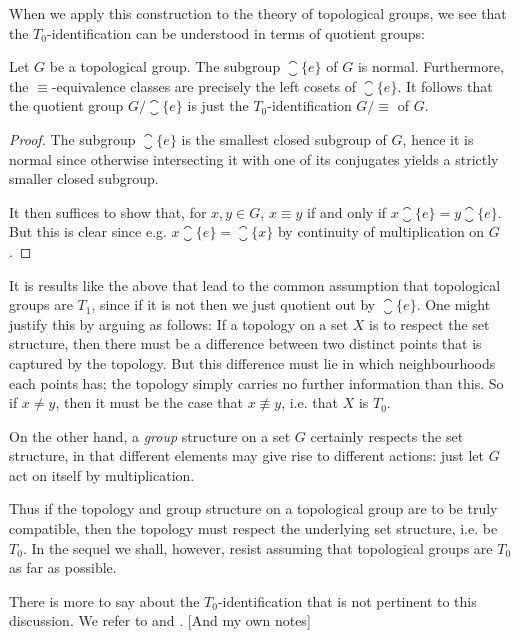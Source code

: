 \documentclass[article, a4paper, 11pt, oneside]{memoir}
\numberwithin{equation}{chapter}
\begin{document}
When we apply this construction to the theory of topological groups, we see that the $T_0$-identification can be understood in terms of quotient groups:

\begin{proposition}
    Let $G$ be a topological group. The subgroup $\closure{\{e\}}$ of $G$ is normal. Furthermore, the $\equiv$-equivalence classes are precisely the left cosets of $\closure{\{e\}}$. It follows that the quotient group $G / \closure{\{e\}}$ is just the $T_0$-identification $G/{\equiv}$ of $G$.
\end{proposition}

\begin{proof}
    The subgroup $\closure{\{e\}}$ is the smallest closed subgroup of $G$, hence it is normal since otherwise intersecting it with one of its conjugates yields a strictly smaller closed subgroup.

    It then suffices to show that, for $x,y \in G$, $x \equiv y$ if and only if $x \closure{\{e\}} = y \closure{\{e\}}$. But this is clear since e.g. $x \closure{\{e\}} = \closure{\{x\}}$ by continuity of multiplication on $G$.
\end{proof}

It is results like the above that lead to the common assumption that topological groups are $T_1$, since if it is not then we just quotient out by $\closure{\{e\}}$. One might justify this by arguing as follows: If a topology on a set $X$ is to respect the set structure, then there must be a difference between two distinct points that is captured by the topology. But this difference must lie in which neighbourhoods each points has; the topology simply carries no further information than this. So if $x \neq y$, then it must be the case that $x \not\equiv y$, i.e. that $X$ is $T_0$.

On the other hand, a \emph{group} structure on a set $G$ certainly respects the set structure, in that different elements may give rise to different actions: just let $G$ act on itself by multiplication.

Thus if the topology and group structure on a topological group are to be truly compatible, then the topology must respect the underlying set structure, i.e. be $T_0$. In the sequel we shall, however, resist assuming that topological groups are $T_0$ as far as possible.

There is more to say about the $T_0$-identification that is not pertinent to this discussion. We refer to \textcite[Exercise~13C]{willard} and \textcite{pirttimäki2019}. [And my own notes]
\end{document}
